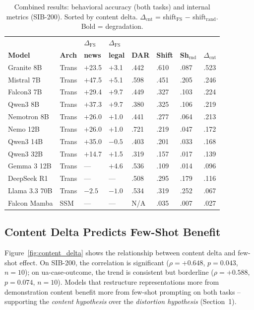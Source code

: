 \documentclass[11pt,a4paper]{article}
\begin{document}
\begin{table}[t]
\centering
\small
\caption{Combined results: behavioral accuracy (both tasks) and internal metrics (SIB-200). Sorted by content delta. $\Delta_{\text{cnt}}$ = shift$_{\text{FS}}$ $-$ shift$_{\text{rand}}$. Bold = degradation.}
\label{tab:internal_main}
\begin{tabular}{llR{0.9cm}R{0.9cm}R{0.7cm}R{0.8cm}R{0.8cm}R{0.8cm}}
\toprule
& & \textbf{$\Delta_{\text{FS}}$} & \textbf{$\Delta_{\text{FS}}$} & & & & \\
\textbf{Model} & \textbf{Arch} & \textbf{news} & \textbf{legal} & \textbf{DAR} & \textbf{Shift} & \textbf{Sh$_{\text{rnd}}$} & \textbf{$\Delta_{\text{cnt}}$} \\
\midrule
Granite 8B       & Trans & $+$23.5 & $+$3.1  & .442 & .610 & .087 & .523 \\
Mistral 7B       & Trans & $+$47.5 & $+$5.1  & .598 & .451 & .205 & .246 \\
Falcon3 7B       & Trans & $+$29.4 & $+$9.7  & .449 & .327 & .103 & .224 \\
Qwen3 8B         & Trans & $+$37.3 & $+$9.7  & .380 & .325 & .106 & .219 \\
Nemotron 8B      & Trans & $+$26.0 & $+$1.0  & .441 & .277 & .064 & .213 \\
Nemo 12B         & Trans & $+$26.0 & $+$1.0  & .721 & .219 & .047 & .172 \\
Qwen3 14B        & Trans & $+$35.0 & $\mathbf{-0.5}$ & .403 & .201 & .033 & .168 \\
Qwen3 32B        & Trans & $+$14.7 & $+$1.5  & .319 & .157 & .017 & .139 \\
Gemma 3 12B      & Trans & ---     & $+$4.6  & .536 & .109 & .014 & .096 \\
DeepSeek R1      & Trans & ---     & ---     & .508 & .295 & .179 & .116 \\
Llama 3.3 70B    & Trans & $\mathbf{-2.5}$ & $\mathbf{-1.0}$ & .534 & .319 & .252 & .067 \\
Falcon Mamba     & SSM   & ---     & ---     & N/A  & .035 & .007 & .027 \\
\bottomrule
\end{tabular}
\end{table}

\subsection{Content Delta Predicts Few-Shot Benefit}

Figure~\ref{fig:content_delta} shows the relationship between content delta and few-shot effect. On SIB-200, the correlation is significant ($\rho = +0.648$, $p = 0.043$, $n = 10$); on ua-case-outcome, the trend is consistent but borderline ($\rho = +0.588$, $p = 0.074$, $n = 10$). Models that restructure representations more from demonstration content benefit more from few-shot prompting on both tasks -- supporting the \emph{content hypothesis} over the \emph{distortion hypothesis} (Section~1).
\end{document}
